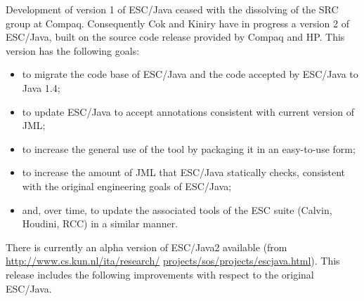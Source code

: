 Development of version 1 of ESC/Java ceased with the dissolving of the
SRC group at Compaq.  Consequently Cok and Kiniry have in progress a
version 2 of ESC/Java, built on the source code release provided by
Compaq and HP.  This version has the following goals:
\begin{itemize}
\item to migrate the code base of ESC/Java and the code accepted by
  ESC/Java to Java 1.4;
\item to update ESC/Java to accept annotations consistent with current
  version of JML;
\item to increase the general use of the tool by packaging it in an
  easy-to-use form;
\item to increase the amount of JML that ESC/Java statically checks,
  consistent with the original engineering goals of ESC/Java;
\item and, over time, to update the associated tools of the ESC suite
  (Calvin, Houdini, RCC) in a similar manner.
\end{itemize}

There is currently an alpha version of ESC/Java2 available
(from \url{http://www.cs.kun.nl/ita/research/} 
\url{projects/sos/projects/escjava.html}).
This release includes the following improvements with respect to the original
ESC/\-Java.


